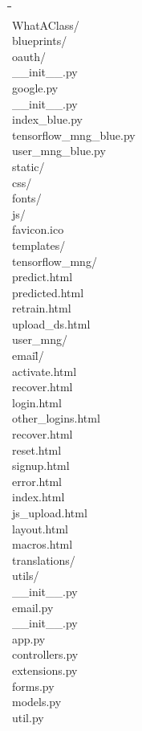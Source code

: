 \begin{tabbing}
\hphantom{tab }\= \hphantom{tab }\= \hphantom{tab }\= \hphantom{tab }\= \hphantom{tab }\= \\
WhatAClass/ \\
\> blueprints/ \\
\> \> oauth/ \\
\> \> \> \_\_init\_\_.py\\
\> \> \> google.py\\
\> \> \_\_init\_\_.py\\
\> \> index\_blue.py\\
\> \> tensorflow\_mng\_blue.py\\
\> \> user\_mng\_blue.py\\
\> static/ \\
\> \> css/ \\
\> \> fonts/\\
\> \> js/\\
\> \> favicon.ico\\
\> templates/\\
\> \> tensorflow\_mng/\\
\> \> \> predict.html\\
\> \> \> predicted.html\\
\> \> \> retrain.html\\
\> \> \> upload\_ds.html\\
\> \> user\_mng/\\
\> \> \> emai\= l/\\
\> \> \> \> activate.html \\
\> \> \> \> recover.html \\
\> \> \> login.html \\
\> \> \> other\_logins.html \\
\> \> \> recover.html \\
\> \> \> reset.html \\
\> \> \> signup.html \\
\> \> error.html \\
\> \> index.html \\
\> \> js\_upload.html \\
\> \> layout.html \\
\> \> macros.html \\
\> translations/ \\
\> utils/ \\
\> \> \_\_init\_\_.py\\
\> \> email.py\\
\> \_\_init\_\_.py\\
\> app.py\\
\> controllers.py\\
\> extensions.py\\
\> forms.py\\
\> models.py\\
\> util.py\\
\end{tabbing}


